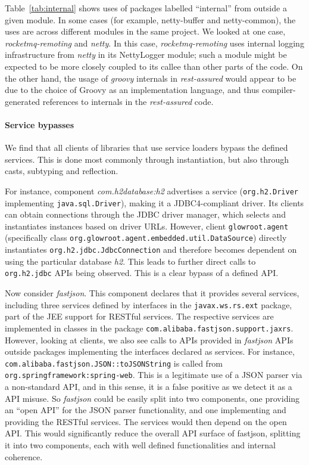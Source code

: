 Table~\ref{tab:internal} shows uses of packages labelled ``internal'' from outside
a given module. In some cases (for example, netty-buffer and netty-common),
the uses are across different modules in the same project. We looked
at one case, \emph{rocketmq-remoting} and \emph{netty}. In this case,
\emph{rocketmq-remoting} uses internal logging infrastructure from
\emph{netty} in its NettyLogger module; such a module might be
expected to be more closely coupled to its callee than other parts of
the code. On the other hand, the usage of \emph{groovy} internals in
\emph{rest-assured} would appear to be due to the choice of Groovy as
an implementation language, and thus compiler-generated references to
internals in the \emph{rest-assured} code.




\paragraph{Service bypasses}
We find that all clients of libraries that use service loaders bypass the defined services. This is done most commonly through instantiation, but also through casts, subtyping and reflection.

For instance, component \emph{com.h2database:h2} advertises a service (\texttt{org.h2.Driver} implementing \texttt{java.sql.Driver}), making it a JDBC4-compliant driver. Its clients can obtain connections through the JDBC driver manager, which selects and instantiates instances based on driver URLs. However, client \texttt{glowroot.agent} (specifically class \texttt{org.glowroot.\-agent.embedded.util.DataSource}) directly instantiates \texttt{org.h2.jdbc.JdbcConnection} and therefore becomes dependent on using the particular database \emph{h2}. This leads to further direct calls to \texttt{org.h2.jdbc} APIs being observed. This is a clear bypass of a defined API. 

Now consider \emph{fastjson}. This component declares that it provides several services, including three services defined by interfaces in the \texttt{javax.ws.rs.ext} package, part of the JEE support for RESTful services. 
The respective services are implemented in classes in the package \texttt{com.alibaba.fastjson.support.jaxrs}.   
However, looking at clients, we also see calls to APIs provided in \emph{fastjson} APIs outside packages implementing the interfaces declared as services. For instance, \texttt{com.alibaba.fastjson.JSON::toJSONString} is called from \texttt{org.springframework:spring-web}.
This is a legitimate use of a JSON parser via a non-standard API, and in this sense, it is a false positive as we detect it as a API misuse. So \emph{fastjson} could be easily split into two components, one providing an ``open API'' for the JSON parser functionality, and one implementing and providing the RESTful services. The services would then depend on the open API. This would significantly reduce the overall API surface of fastjson, splitting it into two components, each with well defined functionalities and internal coherence.

